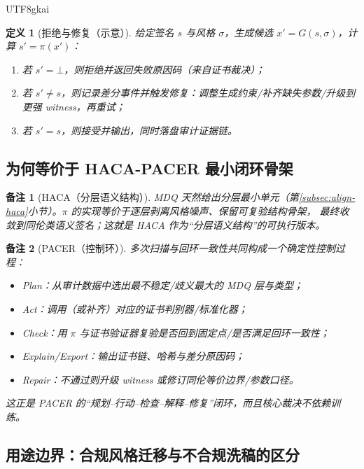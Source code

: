 \documentclass[12pt]{article}
\newtheorem{definition}{定义}[section]
\newtheorem{remark}{备注}[section]
\begin{document}
\begin{CJK*}{UTF8}{gkai}
\begin{definition}[拒绝与修复（示意）]
给定签名 $s$ 与风格 $\sigma$，生成候选 $x'=G(s,\sigma)$，计算 $s'=\pi(x')$：
\begin{enumerate}
  \item 若 $s'=\bot$，则拒绝并返回失败原因码（来自证书裁决）；
  \item 若 $s'\neq s$，则记录差分事件并触发修复：调整生成约束/补齐缺失参数/升级到更强 witness，再重试；
  \item 若 $s'=s$，则接受并输出，同时落盘审计证据链。
\end{enumerate}
\end{definition}

\subsection{为何等价于 HACA-PACER 最小闭环骨架}
\label{subsec:why-haca-pacer}

\begin{remark}[HACA（分层语义结构）]
MDQ 天然给出分层最小单元（第\ref{subsec:align-haca}小节）。$\pi$ 的实现等价于逐层剥离风格噪声、保留可复验结构骨架，
最终收敛到同伦类语义签名；这就是 HACA 作为“分层语义结构”的可执行版本。
\end{remark}

\begin{remark}[PACER（控制环）]
多次扫描与回环一致性共同构成一个确定性控制过程：
\begin{itemize}
  \item Plan：从审计数据中选出最不稳定/歧义最大的 MDQ 层与类型；
  \item Act：调用（或补齐）对应的证书判别器/标准化器；
  \item Check：用 $\pi$ 与证书验证器复验是否回到固定点/是否满足回环一致性；
  \item Explain/Export：输出证书链、哈希与差分原因码；
  \item Repair：不通过则升级 witness 或修订同伦等价边界/参数口径。
\end{itemize}
这正是 PACER 的“规划--行动--检查--解释--修复”闭环，而且核心裁决不依赖训练。
\end{remark}

\subsection{用途边界：合规风格迁移与不合规洗稿的区分}
\label{subsec:compliance-boundary}


\end{CJK*}
\end{document}
